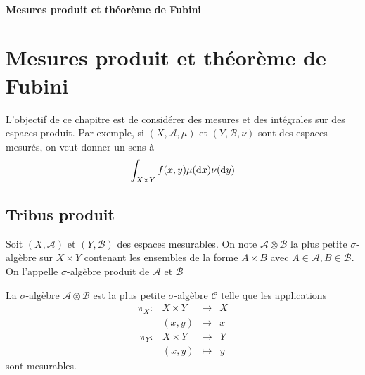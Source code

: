 \ifsolo
    ~

    \vspace{1cm}

    \begin{center}
        \textbf{\LARGE Mesures produit et théorème de Fubini} \\[1em]
    \end{center}
    \tableofcontents
\else
    \chapter{Mesures produit et théorème de Fubini}

    \minitoc
\fi
\thispagestyle{empty}

L'objectif de ce chapitre est de considérer des mesures et des intégrales sur des espaces produit. Par exemple, si $(X, \mathcal  A, \mu)$ et $(Y, \mathcal  B, \nu)$ sont des espaces mesurés, on veut donner un sens à \[
    \int_{X\times Y}f(x, y)\mu(\mathop{}\!\mathrm d x)\nu(\mathop{}\!\mathrm d y)
\] 

\section{Tribus produit}

\begin{dfn}
    Soit $(X, \mathcal  A)$ et $(Y, \mathcal  B)$ des espaces mesurables. On note $\mathcal  A\otimes \mathcal  B$ la plus petite $\sigma$-algèbre sur  $X\times Y$ contenant les ensembles de la forme  $A\times B$ avec  $A \in  \mathcal  A, B \in  \mathcal  B$. On l'appelle $\sigma$-algèbre produit de  $\mathcal  A$ et $\mathcal  B$
\end{dfn}

\begin{prop}
La  $\sigma$-algèbre  $\mathcal  A\otimes \mathcal  B$ est la plus petite $\sigma$-algèbre  $ \mathcal  C$ telle que les applications \[
\begin{array}{rrcl}
    \pi_X:& X\times Y & \longrightarrow & X \\
          & (x, y) & \longmapsto & \displaystyle x
\end{array}
\] 
\[
\begin{array}{rrcl}
    \pi_Y:& X\times Y & \longrightarrow & Y \\
          & (x, y) & \longmapsto & \displaystyle y
\end{array}
\] 
sont mesurables.
\end{prop}

